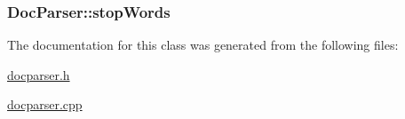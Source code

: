 \subsubsection[{stop\+Words}]{ Doc\+Parser\+::stop\+Words\hspace{0.3cm}{\ttfamily [private]}}\label{class_doc_parser_a089705924f6a28afb59064526b4b7f4f}


The documentation for this class was generated from the following files\+:\begin{DoxyCompactItemize}
\item 
\hyperlink{docparser_8h}{docparser.\+h}\item 
\hyperlink{docparser_8cpp}{docparser.\+cpp}\end{DoxyCompactItemize}

